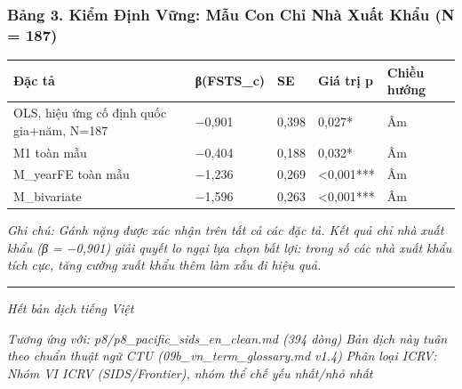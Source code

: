\documentclass[12pt,a4paper]{article}
\begin{document}
\hypertarget{bux1ea3ng-3-kiux1ec3m-ux111ux1ecbnh-vux1eefng-mux1eabu-con-chux1ec9-nhuxe0-xuux1ea5t-khux1ea9u-n--187}{%
\subsubsection{Bảng 3. Kiểm Định Vững: Mẫu Con Chỉ Nhà Xuất Khẩu (N =
187)}\label{bux1ea3ng-3-kiux1ec3m-ux111ux1ecbnh-vux1eefng-mux1eabu-con-chux1ec9-nhuxe0-xuux1ea5t-khux1ea9u-n--187}}

\begin{longtable}[]{@{}lllll@{}}
\toprule\noalign{}
Đặc tả & β(FSTS\_c) & SE & Giá trị p & Chiều hướng \\
\midrule\noalign{}
\endhead
\bottomrule\noalign{}
\endlastfoot
OLS, hiệu ứng cố định quốc gia+năm, N=187 & −0,901 & 0,398 & 0,027* &
Âm \\
M1 toàn mẫu & −0,404 & 0,188 & 0,032* & Âm \\
M\_yearFE toàn mẫu & −1,236 & 0,269 & \textless0,001*** & Âm \\
M\_bivariate & −1,596 & 0,263 & \textless0,001*** & Âm \\
\end{longtable}

\emph{Ghi chú: Gánh nặng được xác nhận trên tất cả các đặc tả. Kết quả
chỉ nhà xuất khẩu (β = −0,901) giải quyết lo ngại lựa chọn bất lợi:
trong số các nhà xuất khẩu tích cực, tăng cường xuất khẩu thêm làm xấu
đi hiệu quả.}

\begin{center}\rule{0.5\linewidth}{0.5pt}\end{center}

\emph{Hết bản dịch tiếng Việt}

\emph{Tương ứng với: p8/p8\_pacific\_sids\_en\_clean.md (394 dòng)}
\emph{Bản dịch này tuân theo chuẩn thuật ngữ CTU
(09b\_vn\_term\_glossary.md v1.4)} \emph{Phân loại ICRV: Nhóm VI ICRV
(SIDS/Frontier), nhóm thể chế yếu nhất/nhỏ nhất}
\end{document}
